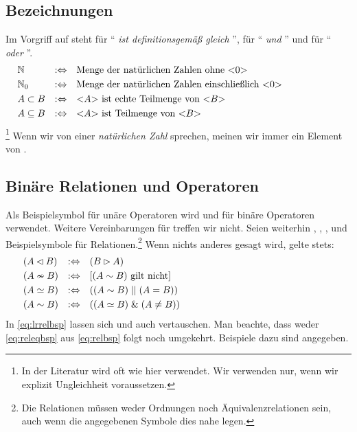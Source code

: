 \subsection{Bezeichnungen}%
\label{sub:Bezeichnungen}

Im Vorgriff auf  steht  für \enquote{ \emph{ist definitionsgemäß gleich} },  für \enquote{ \emph{und} } und  für \enquote{ \emph{oder} }.
\begin{align}
	& \mathbb{N}          & :\Leftrightarrow & \quad
	\text{Menge der natürlichen Zahlen ohne           <$0$>} \\
	& \mathbb{N}_0         & :\Leftrightarrow & \quad
	\text{Menge der natürlichen Zahlen einschließlich <$0$>} \\
	& A \subset B   & :\Leftrightarrow & \quad
	\text{<$A$> ist echte Teilmenge von <$B$>} \\
	& A \subseteq B & :\Leftrightarrow & \quad
	\text{<$A$> ist       Teilmenge von <$B$>} &&&&&&&&&&
\end{align}\footnote{%
	In der Literatur wird \symqt{\subset} oft wie hier \symqt{\subseteq} verwendet.
	Wir verwenden \symqt{\subset} nur, wenn wir explizit Ungleichheit voraussetzen.%
}
Wenn wir von einer \emph{natürlichen Zahl} sprechen, meinen wir immer ein Element von \objqt{\gsNo}.

\subsection{Binäre Relationen und Operatoren}%
\label{sub:binär}

Als Beispielsymbol für unäre Operatoren wird \symqt{\opubsp} und für binäre Operatoren \symqt{\opbsp} verwendet.
Weitere Vereinbarungen für \symqt{\opubsp} treffen wir nicht.
Seien weiterhin , , ,  und  Beispielsymbole für Relationen.\footnote{%
	Die Relationen müssen weder Ordnungen noch Äquivalenzrelationen sein, auch wenn die angegebenen Symbole dies nahe legen.%
}
Wenn nichts anderes gesagt wird, gelte stets:
%
\begin{align}
	& (A \lhd   B) & :\Leftrightarrow & \quad  (B \rhd   A)
	\label{eq:lrrelbsp}   \\
	& (A \nsim  B)  & :\Leftrightarrow & \quad [(A \sim   B) \text{ gilt nicht}]
	\label{eq:relnbsp}    \\
	& (A \simeq  B) & :\Leftrightarrow & \quad ((A \sim   B) \;||\;  (A = B))
	\label{eq:releqbsp}   \\
	& (A \sim B)    & :\Leftrightarrow & \quad ((A \simeq B) \;\&\; (A \ne B))
	\label{eq:relbsp}    &&&&&&&&&&&&&&&&&&&&&&&&&&&&&&
\end{align}
%
In \eqref{eq:lrrelbsp} lassen sich \symqt{\lrelbsp} und \symqt{\rrelbsp} auch vertauschen.
Man beachte, dass weder \eqref{eq:releqbsp} aus \eqref{eq:relbsp} folgt noch umgekehrt.
Beispiele dazu sind  angegeben.

